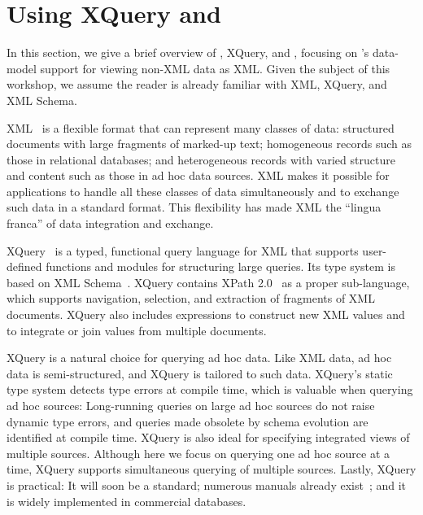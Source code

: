 \section{Using XQuery and \Galax{}}
\label{section:galax}

In this section, we give a brief overview of \Xml{}, XQuery, and
\Galax{}, focusing on \Galax{}'s data-model support for viewing
non-XML data as XML.  Given the subject of this workshop, we assume
the reader is already familiar with XML, XQuery, and XML Schema.

XML~\cite{xml10} is a flexible format that can represent many classes
of data: structured documents with large fragments of marked-up text;
homogeneous records such as those in relational databases; and
heterogeneous records with varied structure and content such as those
in ad hoc data sources.  XML makes it possible for applications to
handle all these classes of data simultaneously and to exchange such
data in a standard format.  This flexibility has made XML the ``lingua
franca'' of data integration and exchange.

XQuery~\cite{xquery10} is a typed, functional query language for XML
that supports user-defined functions and modules for structuring large
queries.  Its type system is based on XML Schema~\cite{xmlschema-1}.  XQuery contains
XPath 2.0~\cite{xpath20} as a proper sub-language, which supports
navigation, selection, and extraction of fragments of XML documents.
XQuery also includes expressions to construct new XML values and to
integrate or join values from multiple documents.  

XQuery is a natural choice for querying ad hoc data.  Like XML data,
ad hoc data is semi-structured, and XQuery is tailored to 
such data.  
XQuery's static type system detects type errors at compile time, which
is valuable when querying ad hoc sources: Long-running queries on
large ad hoc sources do not raise dynamic type errors, and queries
made obsolete by schema evolution are identified at compile time.
XQuery is also ideal for specifying integrated views of multiple
sources.  Although here we focus on querying one ad hoc source at a
time, XQuery supports simultaneous querying of multiple 
sources. Lastly, XQuery is practical: It will soon be a
standard; numerous manuals already exist~\cite{brundage2004}; and it is widely implemented
in commercial databases.


